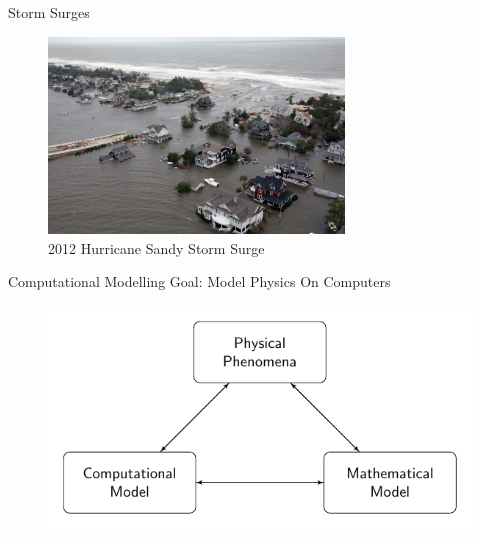 \documentclass[]{beamer}
\begin{document}
\begin{frame}{Storm Surges}
		\begin{figure}
			\includegraphics[width=0.7\textwidth]{./Pics/Examples/Sandy-storm-surge.jpg}
			\caption{2012 Hurricane Sandy Storm Surge}
		\end{figure}
\end{frame}



\begin{frame}{Computational Modelling}
	Goal: Model Physics On Computers \pause
	\begin{figure}
		\includegraphics[width=\textwidth]{./Pics/ModelDiagrams/FlowChart.pdf}
	\end{figure}
\end{frame}
\end{document}
